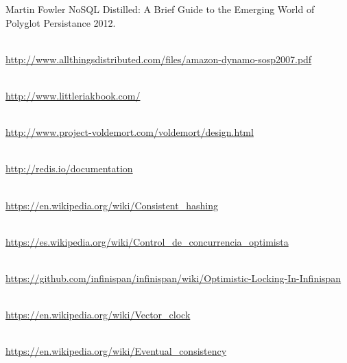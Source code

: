 \begin{thebibliography}{9}

 Martin Fowler {NoSQL Distilled: A Brief Guide to the Emerging World of Polyglot Persistance} 2012.

\\
\url{http://www.allthingsdistributed.com/files/amazon-dynamo-sosp2007.pdf}

\\
\url{http://www.littleriakbook.com/}

\\
\url{http://www.project-voldemort.com/voldemort/design.html}

\\
\url{http://redis.io/documentation}

 \\
\url{https://en.wikipedia.org/wiki/Consistent_hashing}

 \\
\url{https://es.wikipedia.org/wiki/Control_de_concurrencia_optimista}

 \\
\url{https://github.com/infinispan/infinispan/wiki/Optimistic-Locking-In-Infinispan}

 \\
\url{https://en.wikipedia.org/wiki/Vector_clock}

 \\
\url{https://en.wikipedia.org/wiki/Eventual_consistency}

\end{thebibliography}
